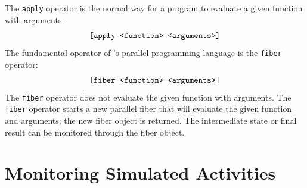 The {\tt apply} operator is the normal way for a {\SALS} program to
evaluate a given function with arguments:
\begin{equation*}
\text{\tt [apply <function> <arguments>]}
\end{equation*}
The fundamental operator of {\SALS}'s parallel programming language is
the {\tt fiber} operator:
\begin{equation*}
\text{\tt [fiber <function> <arguments>]}
\end{equation*}
The {\tt fiber} operator does not evaluate the given function with
arguments.  The {\tt fiber} operator starts a new parallel fiber that
will evaluate the given function and arguments; the new fiber object
is returned.  The intermediate state or final result can be monitored
through the fiber object.

\section{Monitoring Simulated Activities}

